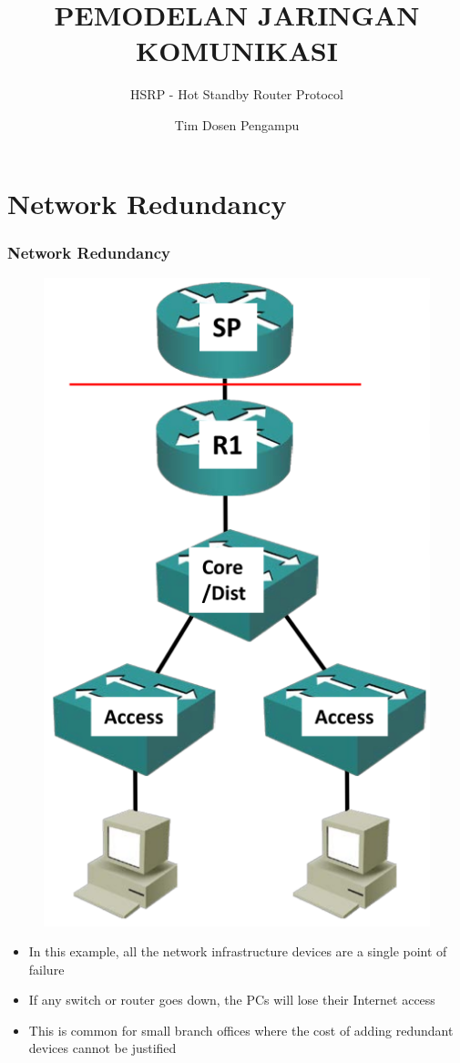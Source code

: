 \documentclass[pdflatex,compress,mathserif]{beamer}
\title{PEMODELAN JARINGAN KOMUNIKASI}
\subtitle{HSRP - Hot Standby Router Protocol}
\author{Tim Dosen Pengampu}
\begin{document}
	
\maketitle

\section{Network Redundancy}

\begin{frame}
	\frametitle{Network Redundancy}
	\begin{multicols}{2}
		\begin{figure}
			\centering
			\includegraphics[height=0.8\textheight]{img/img01}
		\end{figure}
		\columnbreak
		\begin{itemize}
			\item In this example, all the network infrastructure devices
are a single point of failure
			\item If any switch or router goes down, the PCs will lose
their Internet access
			\item This is common for small branch offices where the
cost of adding redundant devices cannot be justified
		\end{itemize}
	\end{multicols}
\end{frame}
\end{document}
